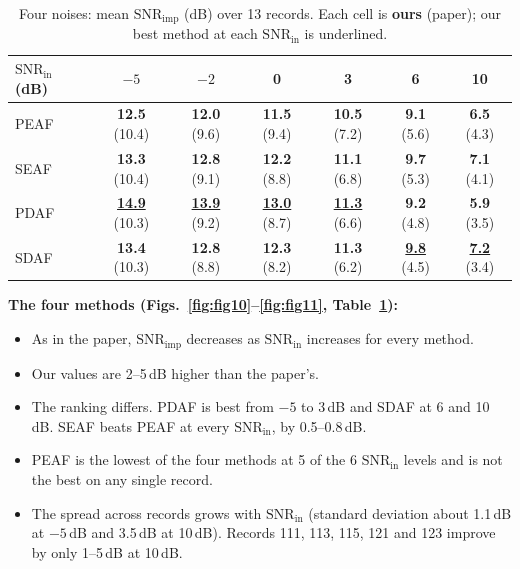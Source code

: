\documentclass[11pt,a4paper]{article}
\newcommand{\snrin}{\mathrm{SNR}_\mathrm{in}}
\newcommand{\snrimp}{\mathrm{SNR}_\mathrm{imp}}
\begin{document}
\begin{table}[!htbp]
\centering\small
\caption{Four noises: mean $\snrimp$ (dB) over 13 records. Each cell is \textbf{ours} (paper); our best method at
  each $\snrin$ is underlined.}
\label{tab:fig11}
\begin{tabular}{lcccccc}
\toprule
$\snrin$ (dB) & $-5$ & $-2$ & 0 & 3 & 6 & 10\\
\midrule
PEAF & \textbf{12.5} (10.4) & \textbf{12.0} (9.6) & \textbf{11.5} (9.4) & \textbf{10.5} (7.2) & \textbf{9.1} (5.6) & \textbf{6.5} (4.3)\\
SEAF & \textbf{13.3} (10.4) & \textbf{12.8} (9.1) & \textbf{12.2} (8.8) & \textbf{11.1} (6.8) & \textbf{9.7} (5.3) & \textbf{7.1} (4.1)\\
PDAF & \underline{\textbf{14.9}} (10.3) & \underline{\textbf{13.9}} (9.2) & \underline{\textbf{13.0}} (8.7) & \underline{\textbf{11.3}} (6.6) & \textbf{9.2} (4.8) & \textbf{5.9} (3.5)\\
SDAF & \textbf{13.4} (10.3) & \textbf{12.8} (8.8) & \textbf{12.3} (8.2) & \textbf{11.3} (6.2) & \underline{\textbf{9.8}} (4.5) & \underline{\textbf{7.2}} (3.4)\\
\bottomrule
\end{tabular}
\end{table}

\textbf{The four methods (Figs.~\ref{fig:fig10}--\ref{fig:fig11}, Table~\ref{tab:fig11}):}
\begin{itemize}
  \item As in the paper, $\snrimp$ decreases as $\snrin$ increases for every method.
  \item Our values are 2--5\,dB higher than the paper's.
  \item The ranking differs. PDAF is best from $-5$ to 3\,dB and SDAF at 6 and 10\,dB. SEAF beats PEAF at every
        $\snrin$, by 0.5--0.8\,dB.
  \item PEAF is the lowest of the four methods at 5 of the 6 $\snrin$ levels and is not the best on any single record.
  \item The spread across records grows with $\snrin$ (standard deviation about 1.1\,dB at $-5$\,dB and 3.5\,dB at
        10\,dB). Records 111, 113, 115, 121 and 123 improve by only 1--5\,dB at 10\,dB.
\end{itemize}
\end{document}
